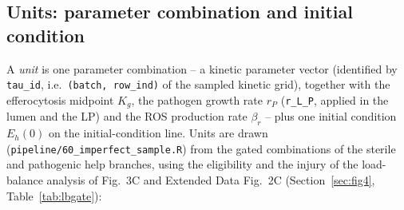\documentclass[11pt]{article}
\begin{document}
\subsection{Units: parameter combination and initial condition}

A \emph{unit} is one parameter combination -- a kinetic parameter vector
(identified by \texttt{tau\_id}, i.e.\ \texttt{(batch, row\_ind)} of the sampled
kinetic grid), together with the efferocytosis midpoint $K_g$, the pathogen
growth rate $r_P$ (\texttt{r\_L\_P}, applied in the lumen and the LP) and
the ROS production rate $\beta_r$ -- plus one initial condition
$E_h(0)$ on the initial-condition line. Units are drawn
(\texttt{pipeline/60\_imperfect\_sample.R}) from the gated combinations of the
sterile and pathogenic help branches, using the eligibility and the injury of
the load-balance analysis of Fig.~3C and Extended Data Fig.~2C (Section~\ref{sec:fig4}, Table~\ref{tab:lbgate}):
\end{document}

